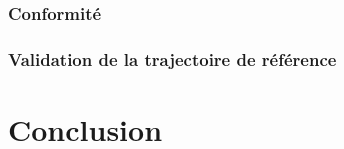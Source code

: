 \documentclass{udes_rapport} %
\begin{document}
\subsubsection{Conformité}
\subsubsection{Validation de la trajectoire de référence}
\section{Conclusion}

\end{document}
